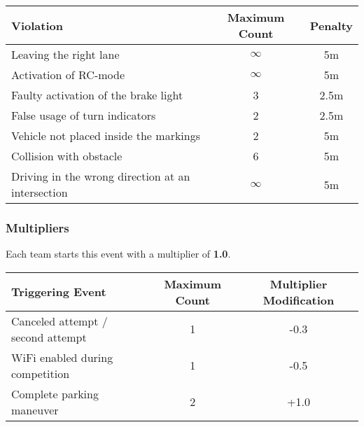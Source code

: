 \begin{table}[H]
	\begin{tabular}{@{}lcc@{}}
		\toprule
		\textbf{Violation}                                & \textbf{Maximum Count} & \textbf{Penalty} \\ \midrule
		Leaving the right lane                            & $\infty$               & 5m               \\
		Activation of RC-mode                             & $\infty$               & 5m               \\
		Faulty activation of the brake light              & 3                      & 2.5m             \\
		False usage of turn indicators                    & 2                      & 2.5m             \\
		Vehicle not placed inside the markings            & 2                      & 5m               \\
		Collision with obstacle                           & 6                      & 5m               \\
		Driving in the wrong direction at an intersection & $\infty$               & 5m               \\
		\bottomrule
	\end{tabular}
\end{table}

\subsubsection{Multipliers}
\label{freedrive_multipliers}

Each team starts this event with a multiplier of \textbf{1.0}.

\begin{table}[H]
	\begin{tabular}{@{}lcc@{}}
		\toprule
		\textbf{Triggering Event}         & \textbf{Maximum Count} & \textbf{Multiplier Modification} \\ \midrule
		Canceled attempt / second attempt & 1                      & -0.3                             \\
		WiFi enabled during competition   & 1                      & -0.5                             \\
		Complete parking maneuver         & 2                      & +1.0                             \\
		\bottomrule
	\end{tabular}
\end{table}